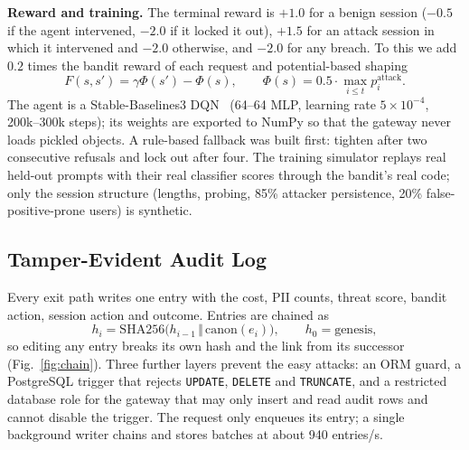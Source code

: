 \documentclass[conference]{IEEEtran}
\begin{document}
\textbf{Reward and training.} The terminal reward is $+1.0$ for a benign
session ($-0.5$ if the agent intervened, $-2.0$ if it locked it out),
$+1.5$ for an attack session in which it intervened and $-2.0$ otherwise,
and $-2.0$ for any breach. To this we add $0.2$ times the bandit reward of
each request and potential-based shaping~\cite{ng1999policy}
\begin{equation}
F(s,s')=\gamma\Phi(s')-\Phi(s),\qquad \Phi(s)=0.5\cdot\max_{i\le t} p^{\text{attack}}_i .
\end{equation}
The agent is a Stable-Baselines3 DQN~\cite{mnih2015human,raffin2021sb3}
(64--64 MLP, learning rate $5\times10^{-4}$, 200k--300k steps); its weights
are exported to NumPy so that the gateway never loads pickled objects. A
rule-based fallback was built first: tighten after two consecutive
refusals and lock out after four. The training simulator replays real
held-out prompts with their real classifier scores through the bandit's
real code; only the session structure (lengths, probing, 85\% attacker
persistence, 20\% false-positive-prone users) is synthetic.

\subsection{Tamper-Evident Audit Log}

Every exit path writes one entry with the cost, PII counts, threat score,
bandit action, session action and outcome. Entries are chained as
\begin{equation}
h_i=\mathrm{SHA256}\bigl(h_{i-1}\,\Vert\,\mathrm{canon}(e_i)\bigr),\qquad h_0=\text{genesis},
\end{equation}
so editing any entry breaks its own hash and the link from its successor
(Fig.~\ref{fig:chain}). Three further layers prevent the easy attacks: an
ORM guard, a PostgreSQL trigger that rejects \texttt{UPDATE},
\texttt{DELETE} and \texttt{TRUNCATE}, and a restricted database role for
the gateway that may only insert and read audit rows and cannot disable
the trigger. The request only enqueues its entry; a single background
writer chains and stores batches at about 940 entries/s.
\end{document}
